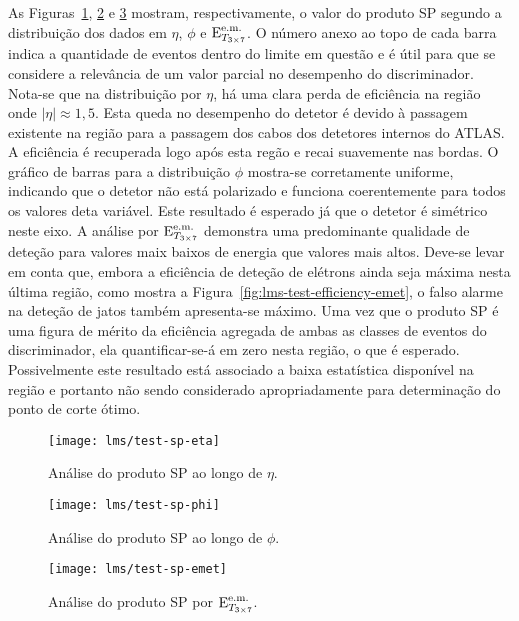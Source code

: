 As Figuras~\ref{fig:lms-test-sp-eta}, \ref{fig:lms-test-sp-phi} e
\ref{fig:lms-test-sp-emet} mostram, respectivamente, o valor do produto SP segundo
a distribuição dos dados em $\eta$, $\phi$ e $\text{E}^{\text{e.m.}}_{T_{3\times7}}$. O número anexo ao topo
de cada barra indica a quantidade de eventos dentro do limite em questão e é
útil para que se considere a relevância de um valor parcial no desempenho do
discriminador. Nota-se que na distribuição por $\eta$, há uma clara perda de
eficiência na região onde $|\eta| \approx 1,5$. Esta queda no desempenho do
detetor é devido à passagem existente na região para a passagem dos cabos dos
detetores internos do ATLAS. A eficiência é recuperada logo após esta regão e
recai suavemente nas bordas. O gráfico de barras para a distribuição $\phi$
mostra-se corretamente uniforme, indicando que o detetor não está polarizado e
funciona coerentemente para todos os valores deta variável. Este resultado é
esperado já que o detetor é simétrico neste eixo. A análise por $\text{E}^{\text{e.m.}}_{T_{3\times7}}$
demonstra uma predominante qualidade de deteção para valores maix baixos de
energia que valores mais altos. Deve-se levar em conta que, embora a
eficiência de deteção de elétrons ainda seja máxima nesta última região, como
mostra a Figura~\ref{fig:lms-test-efficiency-emet}, o falso alarme na deteção
de jatos também apresenta-se máximo. Uma vez que o produto SP é uma figura de
mérito da eficiência agregada de ambas as classes de eventos do discriminador,
ela quantificar-se-á em zero nesta região, o que é esperado. Possivelmente
este resultado está associado a baixa estatística disponível na região e
portanto não sendo considerado apropriadamente para determinação do ponto de
corte ótimo.

\begin{figure}
\begin{center}
\texttt{[image: lms/test-sp-eta]}
\end{center}
\caption{Análise do produto SP ao longo de $\eta$.}
\label{fig:lms-test-sp-eta}
\end{figure}

\begin{figure}
\begin{center}
\texttt{[image: lms/test-sp-phi]}
\end{center}
\caption{Análise do produto SP ao longo de $\phi$.}
\label{fig:lms-test-sp-phi}
\end{figure}

\begin{figure}
\begin{center}
\texttt{[image: lms/test-sp-emet]}
\end{center}
\caption{Análise do produto SP por $\text{E}^{\text{e.m.}}_{T_{3\times7}}$.}
\label{fig:lms-test-sp-emet}
\end{figure}

